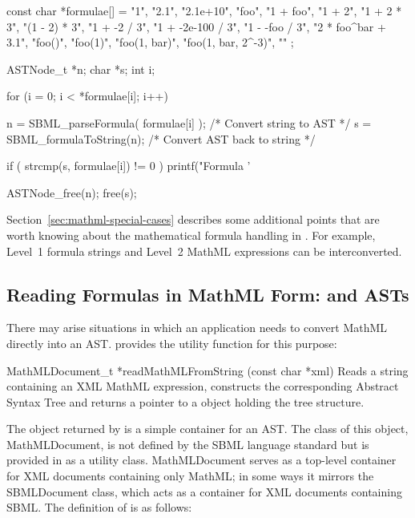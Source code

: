 \documentclass{sbmlmanual}
\begin{document}
\begin{cVerbatim}
  const char *formulae[] =
  {
    "1",
    "2.1",
    "2.1e+10",
    "foo",
    "1 + foo",
    "1 + 2",
    "1 + 2 * 3",
    "(1 - 2) * 3",
    "1 + -2 / 3",
    "1 + -2e-100 / 3",
    "1 - -foo / 3",
    "2 * foo^bar + 3.1",
    "foo()",
    "foo(1)",
    "foo(1, bar)",
    "foo(1, bar, 2^-3)",
    ""
  };
  
  ASTNode_t *n;
  char      *s;
  int        i;
  
  for (i = 0; i < *formulae[i]; i++)
  {
    n = SBML_parseFormula( formulae[i] );  /* Convert string to AST */
    s = SBML_formulaToString(n);           /* Convert AST back to string */
  
    if ( strcmp(s, formulae[i]) != 0 ) 
    {
      printf("Formula '%
    }
  
    ASTNode_free(n);
    free(s);
  }
\end{cVerbatim}

Section~\ref{sec:mathml-special-cases} describes some additional points
that are worth knowing about the mathematical formula handling in
\libsbml{}.  For example,  Level~1 formula strings and Level~2 MathML
expressions can  be interconverted.


\subsection{Reading Formulas in MathML Form:  and ASTs}
\label{sec:mathml-math}

There may arise situations in which an application needs to convert MathML
directly into an AST.  \libsbml{} provides the utility function
 for this purpose:

\begin{methoddef}{MathMLDocument\_t *readMathMLFromString (const char *xml)}
  Reads a string containing an XML MathML expression, constructs the
  corresponding Abstract Syntax Tree and returns a pointer to a
   object holding the tree structure.
\end{methoddef}

The object returned by  is a simple
container for an AST.  The class of this object, MathMLDocument, is not
defined by the SBML language standard but is provided in \libsbml{} as a
utility class.  MathMLDocument serves as a top-level container for XML
documents containing only MathML; in some ways it mirrors the SBMLDocument
class, which acts as a container for XML documents containing SBML.  The
definition of  is as follows:
 
\end{document}

